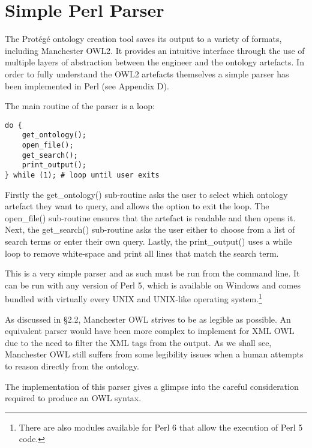 \documentclass[titlepage,a4paper,12pt,oneside]{book}
\begin{document}
\section{Simple Perl Parser}
The Protégé ontology creation tool saves its output to a variety of formats, including Manchester OWL2.
It provides an intuitive interface through the use of multiple layers of abstraction between the engineer and the ontology artefacts.
In order to fully understand the OWL2 artefacts themselves a simple parser has been implemented in Perl (see Appendix D).\par
The main routine of the parser is a loop:
\begin{lstlisting}
do {
	get_ontology();
	open_file();
	get_search();
	print_output();
} while (1); # loop until user exits
\end{lstlisting}
Firstly the get\_ontology() sub-routine asks the user to select which ontology artefact they want to query, and allows the option to exit the loop.
The open\_file() sub-routine ensures that the artefact is readable and then opens it.
Next, the get\_search() sub-routine asks the user either to choose from a list of search terms or enter their own query.
Lastly, the print\_output() uses a while loop to remove white-space and print all lines that match the search term.\par
This is a very simple parser and as such must be run from the command line.
It can be run with any version of Perl 5, which is available on Windows and comes bundled with virtually every UNIX and UNIX-like operating system.\footnote{There are also modules available for Perl 6 that allow the execution of Perl 5 code.}\par
As discussed in §2.2, Manchester OWL strives to be as legible as possible.
An equivalent parser would have been more complex to implement for XML OWL due to the need to filter the XML tags from the output.
As we shall see, Manchester OWL still suffers from some legibility issues when a human attempts to reason directly from the ontology.\par
The implementation of this parser gives a glimpse into the careful consideration required to produce an OWL syntax.
\end{document}
